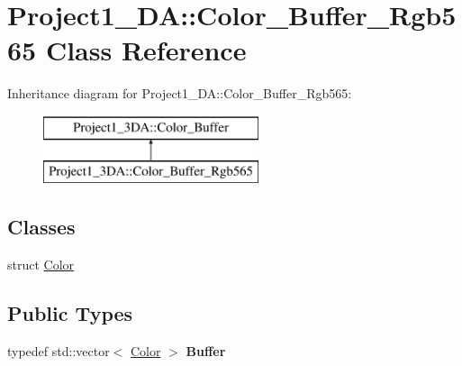 \hypertarget{class_project1__3_d_a_1_1_color___buffer___rgb565}{}\section{Project1\+\_\+DA\+::Color\+\_\+\+Buffer\+\_\+\+Rgb565 Class Reference}
\label{class_project1__3_d_a_1_1_color___buffer___rgb565}
Inheritance diagram for Project1\+\_\+DA\+::Color\+\_\+\+Buffer\+\_\+\+Rgb565\+:\begin{figure}[H]
\begin{center}
\leavevmode
\includegraphics[height=2.000000cm]{class_project1__3_d_a_1_1_color___buffer___rgb565}
\end{center}
\end{figure}
\subsection*{Classes}
\begin{DoxyCompactItemize}
\item 
struct \mbox{\hyperlink{struct_project1__3_d_a_1_1_color___buffer___rgb565_1_1_color}{Color}}
\end{DoxyCompactItemize}
\subsection*{Public Types}
\begin{DoxyCompactItemize}
\item 
\mbox{\label{class_project1__3_d_a_1_1_color___buffer___rgb565_a0b5b3642d56f4102d4a680e2bc0686ce}} 
typedef std\+::vector$<$ \mbox{\hyperlink{struct_project1__3_d_a_1_1_color___buffer___rgb565_1_1_color}{Color}} $>$ {\bfseries Buffer}
\end{DoxyCompactItemize}

